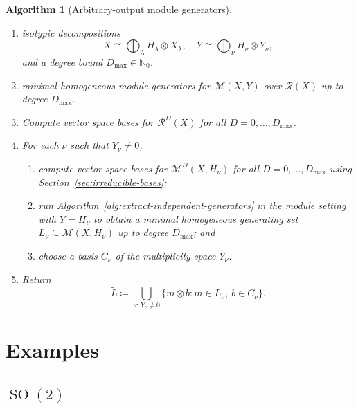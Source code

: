 \documentclass[11pt]{article}
\newcommand{\dsN}{\mathbb{N}}
\newcommand{\scM}{\mathcal{M}}
\newcommand{\scR}{\mathcal{R}}
\newcommand{\SO}{\operatorname{SO}}
\newtheorem{algorithm}[theorem]{Algorithm}
\theoremstyle{definition}
\begin{document}
\begin{algorithm}[Arbitrary-output module generators]\label{alg:arbitrary-output-module-generators}

  \phantom{}
  \begin{enumerate}[label=\textbf{Step \arabic*.},leftmargin=2.8cm]

    \item[\textbf{Input:}] isotypic decompositions
    \[
      X\cong \bigoplus_\lambda H_\lambda\otimes X_\lambda,
      \quad
      Y\cong \bigoplus_\nu H_\nu\otimes Y_\nu,
    \]
    and a degree bound $D_{\max}\in\dsN_0$.

    \item[\textbf{Output:}] minimal homogeneous module generators for $\scM(X,Y)$ over $\scR(X)$ up to degree $D_{\max}$.

    \item Compute vector space bases for $\scR^D(X)$ for all $D=0,\dots,D_{\max}$.

    \item For each $\nu$ such that $Y_\nu\neq 0$,
    \begin{enumerate}[leftmargin=2.2em]
      \item compute vector space bases for $\scM^D(X,H_\nu)$ for all $D=0,\dots,D_{\max}$ using Section~\ref{sec:irreducible-bases};
      \item run Algorithm~\ref{alg:extract-independent-generators} in the module setting with $Y=H_\nu$ to obtain a minimal homogeneous generating set $L_\nu\subseteq \scM(X,H_\nu)$ up to degree $D_{\max}$; and
      \item choose a basis $C_\nu$ of the multiplicity space $Y_\nu$.
    \end{enumerate}

    \item Return
    \[
      \widetilde L\coloneq \bigcup_{\nu:\,Y_\nu\neq 0}\{m\otimes b : m\in L_\nu,\ b\in C_\nu\}.
    \]
  \end{enumerate}
\end{algorithm}



\section{Examples}\label{sec:examples}

\subsection{\texorpdfstring{$\SO(2)$}{SO(2)}}\label{sec:examples-so2}
\end{document}
